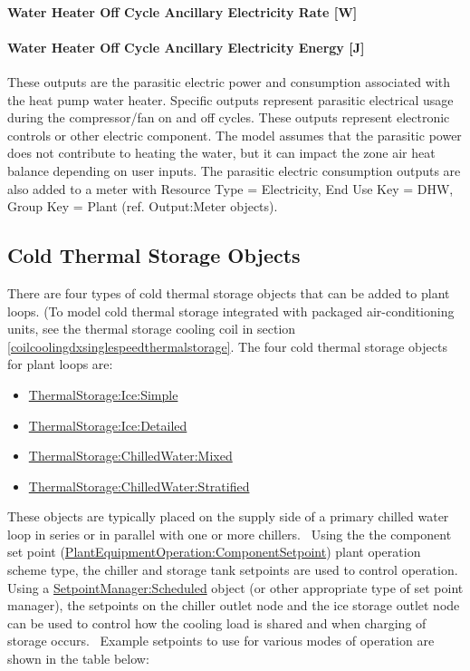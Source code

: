 \paragraph{Water Heater Off Cycle Ancillary Electricity Rate {[}W{]}}\label{water-heater-off-cycle-ancillary-electric-power-w-1}

\paragraph{Water Heater Off Cycle Ancillary Electricity Energy {[}J{]}}\label{water-heater-off-cycle-ancillary-electric-energy-j-1}

These outputs are the parasitic electric power and consumption associated with the heat pump water heater. Specific outputs represent parasitic electrical usage during the compressor/fan on and off cycles. These outputs represent electronic controls or other electric component. The model assumes that the parasitic power does not contribute to heating the water, but it can impact the zone air heat balance depending on user inputs. The parasitic electric consumption outputs are also added to a meter with Resource Type = Electricity, End Use Key = DHW, Group Key = Plant (ref. Output:Meter objects).

\subsection{Cold Thermal Storage Objects}\label{thermal-storage-objects}

There are four types of cold thermal storage objects that can be added to plant loops. (To model cold thermal storage integrated with packaged air-conditioning units, see the thermal storage cooling coil in section \ref{coilcoolingdxsinglespeedthermalstorage}.  The four cold thermal storage objects for plant loops are:

\begin{itemize}
\item
  \hyperref[thermalstorageicesimple]{ThermalStorage:Ice:Simple}
\item
  \hyperref[thermalstorageicedetailed]{ThermalStorage:Ice:Detailed}
\item
  \hyperref[thermalstoragechilledwatermixed]{ThermalStorage:ChilledWater:Mixed}
\item
  \hyperref[thermalstoragechilledwaterstratified]{ThermalStorage:ChilledWater:Stratified}
\end{itemize}

These objects are typically placed on the supply side of a primary chilled water loop in series or in parallel with one or more chillers.~ Using the the component set point (\hyperref[plantequipmentoperationcomponentsetpoint]{PlantEquipmentOperation:ComponentSetpoint}) plant operation scheme type, the chiller and storage tank setpoints are used to control operation. Using a \hyperref[setpointmanagerscheduled]{SetpointManager:Scheduled} object (or other appropriate type of set point manager), the setpoints on the chiller outlet node and the ice storage outlet node can be used to control how the cooling load is shared and when charging of storage occurs.~ Example setpoints to use for various modes of operation are shown in the table below:

